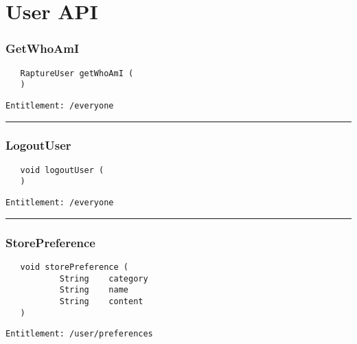 \chapter{User API}

\subsection{GetWhoAmI}
\label{Api:GetWhoAmI}
\begin{verbatim}
   RaptureUser getWhoAmI (
   )
\end{verbatim}
\begin{Verbatim}[fontsize=\small, formatcom=\color{Maroon}]
  Entitlement: /everyone
\end{Verbatim}



\rule{12cm}{2pt}
\subsection{LogoutUser}
\label{Api:LogoutUser}
\begin{verbatim}
   void logoutUser (
   )
\end{verbatim}
\begin{Verbatim}[fontsize=\small, formatcom=\color{Maroon}]
  Entitlement: /everyone
\end{Verbatim}



\rule{12cm}{2pt}
\subsection{StorePreference}
\label{Api:StorePreference}
\begin{verbatim}
   void storePreference (
           String    category
           String    name
           String    content
   )
\end{verbatim}
\begin{Verbatim}[fontsize=\small, formatcom=\color{Maroon}]
  Entitlement: /user/preferences
\end{Verbatim}



